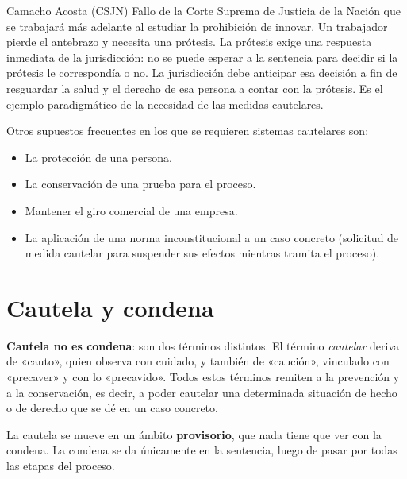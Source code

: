 \documentclass[12pt,oneside]{book}
\begin{document}
\begin{example}{Camacho Acosta (CSJN)}
Fallo de la Corte Suprema de Justicia de la Nación que se trabajará más adelante al estudiar la prohibición de innovar. Un trabajador pierde el antebrazo y necesita una prótesis. La prótesis exige una respuesta inmediata de la jurisdicción: no se puede esperar a la sentencia para decidir si la prótesis le correspondía o no. La jurisdicción debe anticipar esa decisión a fin de resguardar la salud y el derecho de esa persona a contar con la prótesis. Es el ejemplo paradigmático de la necesidad de las medidas cautelares.
\end{example}

Otros supuestos frecuentes en los que se requieren sistemas cautelares son:

\begin{itemize}
    \item La protección de una persona.
    \item La conservación de una prueba para el proceso.
    \item Mantener el giro comercial de una empresa.
    \item La aplicación de una norma inconstitucional a un caso concreto (solicitud de medida cautelar para suspender sus efectos mientras tramita el proceso).
\end{itemize}

\section{Cautela y condena}

\textbf{Cautela no es condena}: son dos términos distintos. El término \textit{cautelar} deriva de «cauto», quien observa con cuidado, y también de «caución», vinculado con «precaver» y con lo «precavido». Todos estos términos remiten a la prevención y a la conservación, es decir, a poder cautelar una determinada situación de hecho o de derecho que se dé en un caso concreto.

\begin{important}
La cautela se mueve en un ámbito \textbf{provisorio}, que nada tiene que ver con la condena. La condena se da únicamente en la sentencia, luego de pasar por todas las etapas del proceso.
\end{important}
\end{document}
